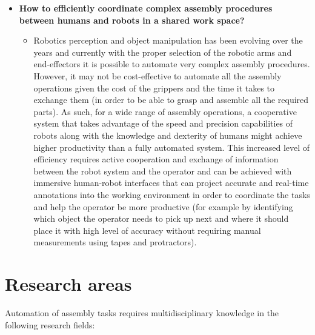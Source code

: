 \begin{itemize}
	\item \textbf{How to efficiently coordinate complex assembly procedures between humans and robots in a shared work space?}
	\begin{itemize}
		\item Robotics perception and object manipulation has been evolving over the years and currently with the proper selection of the robotic arms and end-effectors it is possible to automate very complex assembly procedures. However, it may not be cost-effective to automate all the assembly operations given the cost of the grippers and the time it takes to exchange them (in order to be able to grasp and assemble all the required parts). As such, for a wide range of assembly operations, a cooperative system that takes advantage of the speed and precision capabilities of robots along with the knowledge and dexterity of humans might achieve higher productivity than a fully automated system. This increased level of efficiency requires active cooperation and exchange of information between the robot system and the operator and can be achieved with immersive human-robot interfaces that can project accurate and real-time annotations into the working environment in order to coordinate the tasks and help the operator be more productive (for example by identifying which object the operator needs to pick up next and where it should place it with high level of accuracy without requiring manual measurements using tapes and protractors).
	\end{itemize}
\end{itemize}



\section{Research areas}

Automation of assembly tasks requires multidisciplinary knowledge in the following research fields:

